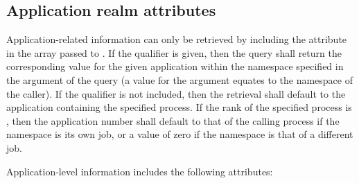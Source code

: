 %
%
%


\subsection{Application realm attributes}
\label{chap:res:aprealm}

Application-related information can only be retrieved by including the
 attribute in the  array passed to
. If the  qualifier is given, then the
query shall return the corresponding value for the given application within the
namespace specified in the  argument of the query (a 
value for the  argument equates to the namespace of the caller).
If the  qualifier is not included, then the retrieval
shall default to the application containing the specified process. If the rank
of the specified process is ,
then the application number shall default to that of the calling process if the
namespace is its own job, or a value of zero if the namespace is that of a
different job.

Application-level information includes the following attributes:


